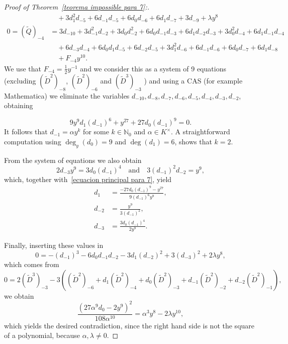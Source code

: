 \documentclass[reqno,a4paper,twoside]{amsart}
\theoremstyle{definition}
\theoremstyle{remark}
\begin{document}
\begin{proof}[Proof of Theorem~\ref{teorema impossible para 7}:]
\begin{align*}
 &\quad + 3 d_1^2 d_{-5} + 6 d_{-1} d_{-5} + 6 d_0 d_{-6} + 6 d_1 d_{-7} + 3 d_{-9}+\lambda y^8\\
0=(\tilde Q)_{-4}&= 3 d_{-10} + 3 d_{-1}^2 d_{-2} + 3 d_0 d_{-2}^2 + 6 d_0 d_{-1} d_{-3} + 6 d_1 d_{-2} d_{-3} +  3 d_0^2 d_{-4} + 6 d_1 d_{-1} d_{-4}\\
&\quad + 6 d_{-3} d_{-4} + 6 d_0 d_1 d_{-5} + 6 d_{-2} d_{-5} +  3 d_1^2 d_{-6} + 6 d_{-1} d_{-6} + 6 d_0 d_{-7} + 6 d_1 d_{-8}\\
&\quad + F_{-4}y^{10}.
\end{align*}
We use that $F_{-4}=\frac 12 y^{-1}$ and we consider this as a system of 9 equations (excluding $(\tilde D^2)_{-8}$, $(\tilde D^2)_{-6}$ and $(\tilde D^3)_{-3}$ )
 and using a CAS (for example Mathematica) we eliminate the variables $d_{-10}, d_{-8}, d_{-7}, d_{-6}, d_{-5}, d_{-4}, d_{-3}, d_{-2}$, obtaining

\begin{equation}\label{ecuacion principal para 7}
  9 y^9 d_1 (d_{-1})^6 +  y^{27} + 27 d_0 (d_{-1})^9=0.
\end{equation}
It follows that $d_{-1}=\alpha y^k$  for some $k\in \mathds{N}_0$ and $\alpha\in K^{\times}$.
A straightforward computation using $\deg_y(d_0)=9$ and $\deg(d_1)=6$, shows that $k=2$.

From the system of equations we also obtain
$$
2 d_{-3} y^9 = 3 d_0 (d_{-1})^4\quad\text{and}\quad  3 (d_{-1})^2 d_{-2} = y^9,
$$
which, together with~\eqref{ecuacion principal para 7}, yield
\begin{align*}
  d_1 & =\frac{-27 d_0 (d_{-1})^9 - y^{27}}{9 (d_{-1})^6 y^9}, \\
  d_{-2} & = \frac{y^9}{3(d_{-1})^2},\\
  d_{-3} & = \frac{3 d_0 (d_{-1})^4}{2 y^9}.
\end{align*}

Finally, inserting these values in
$$
0=-(d_{-1})^3 - 6 d_0 d_{-1} d_{-2} - 3 d_1 (d_{-2})^2 + 3 (d_{-3})^2 + 2 \lambda y^8,
$$
which comes from
$$
0=2(\tilde D^3)_{-3}-3 \left((\tilde D^2)_{-6} + d_1(\tilde D^2)_{-4} + d_0(\tilde D^2)_{-3} + d_{-1}(\tilde D^2)_{-2} + d_{-2} (\tilde D^2)_{-1}\right),
$$
we obtain
$$
\frac{(27 \alpha^9 d_0 - 2 y^9)^2}{108 \alpha^{10}}=\alpha^3 y^8 - 2 \lambda y^{10},
$$
which yields the desired contradiction, since the right hand side is not the square of a polynomial, because $\alpha,\lambda\ne 0$.
\end{proof}
\end{document}
